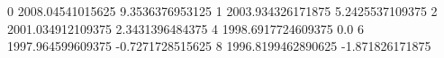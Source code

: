 0 2008.04541015625 9.3536376953125
1 2003.934326171875 5.2425537109375
2 2001.034912109375 2.3431396484375
4 1998.6917724609375 0.0
6 1997.964599609375 -0.7271728515625
8 1996.8199462890625 -1.871826171875
